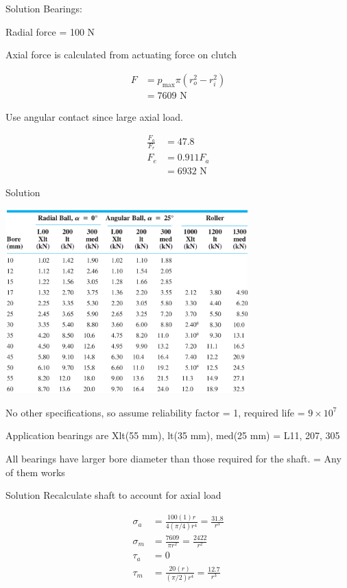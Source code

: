 \documentclass[10pt, svgnames]{beamer}
\begin{document}
\begin{frame}[label={sec:orge313e0e}]{Solution}
Bearings:

Radial force = 100 N

Axial force is calculated from actuating force on clutch

\begin{align*}
    F &= p_{\max} \pi \left( r_o^2 - r_i^2 \right) \\
        &= 7609 \text{ N}
\end{align*}

Use angular contact since large axial load.

\begin{align*}
  \frac{F_a}{F_r} &= 47.8 \\
  F_e &= 0.911F_a \\
                  &= 6932 \text{ N}
\end{align*}
\end{frame}

\begin{frame}[label={sec:org7e65041}]{Solution}
\begin{center}
\includegraphics[width=0.7\textwidth]{./pictures/bearing-rated-capacity.png}
\end{center}

No other specifications, so assume reliability factor = 1, required life = \(9 \times 10^7\)

Application bearings are Xlt(55 mm), lt(35 mm), med(25 mm) = L11, 207, 305

All bearings have larger bore diameter than those required for the shaft. = Any of them works
\end{frame}


\begin{frame}[label={sec:org37c901c}]{Solution}
Recalculate shaft to account for axial load

\begin{align*}
  \sigma_{a} &= \frac{100(1)r}{4(\pi/4)r^{4}} = \frac{31.8}{r^3} \\
  \sigma_{m} &= \frac{7609}{\pi r^2} = \frac{2422}{r^2} \\
  \tau_{a} &= 0 \\
  \tau_{m} &= \frac{20(r)}{(\pi/2)r^{4}} = \frac{12.7}{r^3}
\end{align*}
\end{frame}
\end{document}
